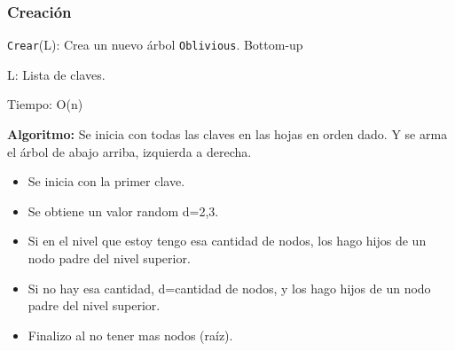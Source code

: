 \documentclass[10pt,handout]{beamer}
\begin{document}
\begin{frame}
\frametitle{Creación}

\texttt{Crear}(L): Crea un nuevo árbol \texttt{Oblivious}. Bottom-up

  L: Lista de claves.

  Tiempo: O(n)

\pause
\textbf{Algoritmo:}
  Se inicia con todas las claves en las hojas en orden dado.
  Y se arma el árbol de abajo arriba, izquierda a derecha.

\pause
\begin{itemize}\itemsep-1em
  \item Se inicia con la primer clave.
  \item Se obtiene un valor random d={2,3}.
\pause
  \item Si en el nivel que estoy tengo esa cantidad de nodos, los hago hijos de
    un nodo padre del nivel superior.
  \item Si no hay esa cantidad, d=cantidad de nodos, y los hago hijos de un nodo
    padre del nivel superior.
\pause
  \item Finalizo al no tener mas nodos (raíz).
\end{itemize}

\end{frame}

\end{document}

